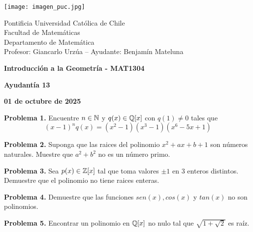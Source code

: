\documentclass{article}
\begin{document}
\begin{minipage}{2.5cm}
    \texttt{[image: imagen\_puc.jpg]}
\end{minipage}
\begin{minipage}{14cm}
    {\sc Pontificia Universidad Católica de Chile\\
    Facultad de Matemáticas\\
    Departamento de Matemática\\
    Profesor: Giancarlo Urzúa -- Ayudante: Benjamín Mateluna}
\end{minipage}
\vspace{1ex}

{\centerline{\bf Introducción a la Geometría - MAT1304}
\centerline{\bf Ayudantía 13}}
\centerline{\bf 01 de octubre de 2025}

\vspace{1cm}
\noindent\textbf{Problema 1.} Encuentre $n\in\mathbb{N}$ y $q(x)\in\mathbb{Q}[x]$ con $q(1)\neq0$ tales que
\begin{equation*}
    (x-1)^{n}q(x)=(x^{2}-1)(x^{3}-1)(x^{6}-5x+1)
\end{equation*}

\vspace{5mm}
\noindent\textbf{Problema 2.} Suponga que las raices del polinomio $x^{2}+ax+b+1$ son números 
naturales. Muestre que $a^{2}+b^{2}$ no es un número primo.

\vspace{5mm}
\noindent\textbf{Problema 3.} Sea $p(x)\in\mathbb{Z}[x]$ tal que toma valores $\pm1$ en $3$ enteros 
distintos. Demuestre que el polinomio no tiene raices enteras.

\vspace{5mm}
\noindent\textbf{Problema 4.} Demuestre que las funciones $sen(x),cos(x)$ y $tan(x)$ no son 
polinomios.

\vspace{5mm}
\noindent\textbf{Problema 5.} Encontrar un polinomio en $\mathbb{Q}[x]$ no nulo tal que 
$\sqrt{1+\sqrt{2}}$ es raíz.

\end{document}

